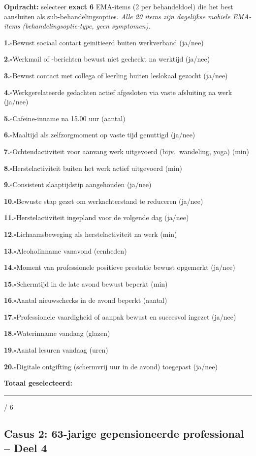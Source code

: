 \documentclass[11pt,a4paper]{article}
\newcommand{\checkitemBFS}[2]{%
\noindent\small\textbf{#1.}\hspace{0.45em}$\square$\hspace{0.4em}#2\par\vspace{0.20em}}
\begin{document}
\begin{responsebox}
\small\textbf{Opdracht:} selecteer \textbf{exact 6} EMA-items (2 per behandeldoel) die het best aansluiten als sub-behandelingsopties.
\textit{Alle 20 items zijn dagelijkse mobiele EMA-items (behandelingsoptie-type, geen symptomen).}

\checkitemBFS{1}{Bewust sociaal contact geinitieerd buiten werkverband (ja/nee)}
\checkitemBFS{2}{Werkmail of -berichten bewust niet gecheckt na werktijd (ja/nee)}
\checkitemBFS{3}{Bewust contact met collega of leerling buiten leslokaal gezocht (ja/nee)}
\checkitemBFS{4}{Werkgerelateerde gedachten actief afgesloten via vaste afsluiting na werk (ja/nee)}
\checkitemBFS{5}{Cafeine-inname na 15.00 uur (aantal)}
\checkitemBFS{6}{Maaltijd als zelfzorgmoment op vaste tijd genuttigd (ja/nee)}
\checkitemBFS{7}{Ochtendactiviteit voor aanvang werk uitgevoerd (bijv.\ wandeling, yoga) (min)}
\checkitemBFS{8}{Herstelactiviteit buiten het werk actief uitgevoerd (min)}
\checkitemBFS{9}{Consistent slaaptijdstip aangehouden (ja/nee)}
\checkitemBFS{10}{Bewuste stap gezet om werkachterstand te reduceren (ja/nee)}
\checkitemBFS{11}{Herstelactiviteit ingepland voor de volgende dag (ja/nee)}
\checkitemBFS{12}{Lichaamsbeweging als herstelactiviteit na werk (min)}
\checkitemBFS{13}{Alcoholinname vanavond (eenheden)}
\checkitemBFS{14}{Moment van professionele positieve prestatie bewust opgemerkt (ja/nee)}
\checkitemBFS{15}{Schermtijd in de late avond bewust beperkt (min)}
\checkitemBFS{16}{Aantal nieuwschecks in de avond beperkt (aantal)}
\checkitemBFS{17}{Professionele vaardigheid of aanpak bewust en succesvol ingezet (ja/nee)}
\checkitemBFS{18}{Waterinname vandaag (glazen)}
\checkitemBFS{19}{Aantal lesuren vandaag (uren)}
\checkitemBFS{20}{Digitale ontgifting (schermvrij uur in de avond) toegepast (ja/nee)}
\vspace{0.4em}
\noindent\textbf{Totaal geselecteerd:}\hspace{0.5em}\rule{1.2cm}{0.25pt}\hspace{0.2em}/ 6
\end{responsebox}

\vspace{0.6em}
\newpage
\subsection*{Casus 2: 63-jarige gepensioneerde professional -- Deel 4}
\end{document}
